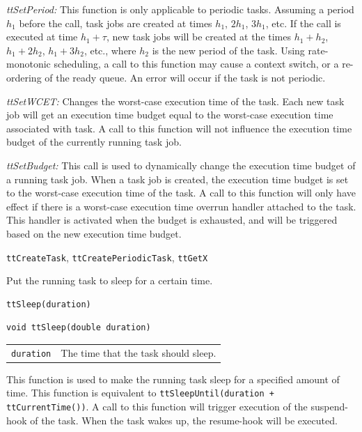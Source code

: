 \documentclass[final,twoside]{rapport}
\begin{document}
{\it ttSetPeriod:} This function is only applicable to periodic tasks.
Assuming a period $h_1$ before the call, task jobs are created at
times $h_1$, $2h_1$, $3h_1$, etc. If the call is executed at time $h_1
+ \tau$, new task jobs will be created at the times $h_1 + h_2$,
$h_1 + 2h_2$, $h_1 + 3h_2$, etc., where $h_2$ is the new period of the
task. Using rate-monotonic scheduling, a call to this function may
cause a context switch, or a re-ordering of the ready queue. An error
will occur if the task is not periodic.

{\it ttSetWCET:} Changes the worst-case execution time of the task.
Each new task job will get an execution time budget equal to the
worst-case execution time associated with task. A call to this
function will not influence the execution time budget of the currently
running task job.

{\it ttSetBudget:} This call is used to dynamically change the
execution time budget of a running task job. When a task job
is created, the execution time budget is set to the worst-case
execution time of the task. A call to this function will only have
effect if there is a worst-case execution time overrun handler
attached to the task. This handler is activated when the budget is
exhausted, and will be triggered based on the new execution time
budget.

\seealso
\texttt{ttCreateTask}, \texttt{ttCreatePeriodicTask}, \texttt{ttGetX} 



\purpose
Put the running task to sleep for a certain time.

\Msyntax
\begin{verbatim}
ttSleep(duration)
\end{verbatim}

\Csyntax
\begin{verbatim}
void ttSleep(double duration)
\end{verbatim}

\args
\begin{tabularx}{\hsize}{l>{\raggedright\arraybackslash}X}
  {\tt duration} & The time that the task should sleep. \\
\end{tabularx}

\descr This function is used to make the running task sleep for a
specified amount of time. This function is equivalent to
\texttt{ttSleepUntil(duration + ttCurrentTime())}. A call to this
function will trigger execution of the suspend-hook of the task. When
the task wakes up, the resume-hook will be executed.
\end{document}
